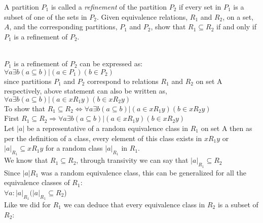 \documentclass[addpoints]{exam}
\begin{document}
\begin{questions}
\begin{solution}
  \end{solution}

\question[5] A partition $P_1$ is called a \textit{refinement} of the partition $P_2$ if every set in $P_1$ is a subset of one of the sets in $P_2$. Given equivalence relations, $R_1$ and $R_2$, on a set, $A$, and the corresponding partitions, $P_1$ and $P_2$, show that $R_1 \subseteq R_2$ if and only if $P_1$ is a refinement of $P_2$.
  \begin{solution}
    \\ $P_1$ is a refinement of $P_2$ can be expressed as:\\
    $ \forall a \exists b  (a \subseteq b) | (a \in P_1) (b \in P_2)$\\
    since partitions $P_1$ and $P_2$ correspond to relations $R_1$ and $R_2$ on set A respectively, above statement can also be written as,
    \\$ \forall a \exists b  (a \subseteq b) | (a \in xR_1y) (b \in xR_2y)$\\
    To show that  $R_1 \subseteq R_2 \iff \forall a \exists b  (a \subseteq b) | (a \in xR_1y) (b \in xR_2y)$\\
    First $R_1 \subseteq R_2 \Rightarrow \forall a \exists b  (a \subseteq b) | (a \in xR_1y) (b \in xR_2y)$\\
    Let $|a|$ be a representative of a random equivalence class in $R_1$ on set A then as per the definition of a class, every element of this class exists in $xR_1y$ or $|a|_{R_1} \subseteq xR_1y$ for a random class $|a|_{R_1}$ in $R_1$.\\
    We know that $R_1 \subseteq R_2$, through transivity we can say that $|a|_{R_1} \subseteq R_2$ \\
    Since $|a|R_1$ was a random equivalence class, this can be generalized for all the equivalence classes of $R_1$:\\
    $\forall a : |a|_{R_1}  (|a|_{R_1} \subseteq R_2$)
    \\Like we did for $R_1$ we can deduce that every equivalence class in $R_2$ is a subset of $R_2$:

\end{solution}
\end{questions}
\end{document}
